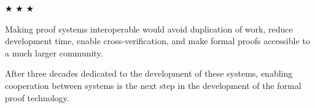 
\begin{center}
$\bigstar$ $\bigstar$ $\bigstar$
\end{center}

Making proof systems interoperable would avoid duplication of work,
reduce development time, enable cross-verification, and make formal
proofs accessible to a much larger community.  

After three decades
dedicated to the development of these systems, enabling
cooperation between systems is the next step in the development of the
formal proof technology.

\medskip

